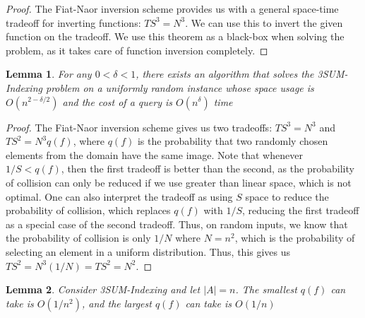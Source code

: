 \documentclass{article}
\newtheorem{lemma}{Lemma}
\begin{document}
\begin{proof}
The Fiat-Naor inversion scheme provides us with a general space-time tradeoff for inverting functions: $TS^3 = N^3$. We can use this to invert the given function on the tradeoff. We use this theorem as a black-box when solving the problem, as it takes care of function inversion completely. 
\end{proof}

\begin{lemma}
\label{Random Instances}
For any $0 < \delta < 1$, there exists an algorithm that solves the 3SUM-Indexing problem on a uniformly random instance whose space usage is $O(n^{2 - \delta/2})$ and the cost of a query is $O(n^{\delta})$ time
\end{lemma}

\begin{proof}
The Fiat-Naor inversion scheme gives us two tradeoffs: $TS^3 = N^3$ and $TS^2 = N^3q(f)$, where $q(f)$ is the probability that two randomly chosen elements from the domain have the same image. Note that whenever $1/S < q(f)$, then the first tradeoff is better than the second, as the probability of collision can only be reduced if we use greater than linear space, which is not optimal. One can also interpret the tradeoff as using $S$ space to reduce the probability of collision, which replaces $q(f)$ with $1/S$, reducing the first tradeoff as a special case of the second tradeoff. Thus, on random inputs, we know that the probability of collision is only $1/N$ where $N=n^2$, which is the probability of selecting an element in a uniform distribution. Thus, this gives us $TS^2 = N^3(1/N) = TS^2 = N^2$.
\end{proof}

\begin{lemma}
\label{Min and Max q(f) values}
Consider 3SUM-Indexing and let $|A| = n$. The smallest $q(f)$ can take is $O(1/n^2)$, and the largest $q(f)$ can take is $O(1/n)$
\end{lemma}
\end{document}
